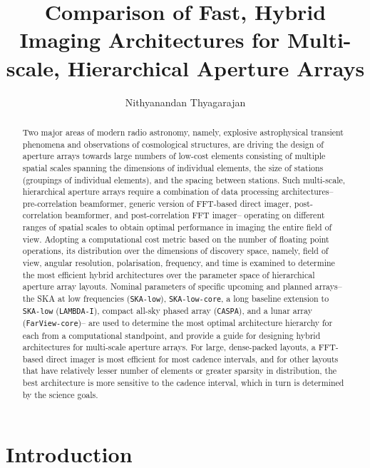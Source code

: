 \documentclass[
  journal=pasa,
  manuscript=article-type,
  year=2020,
  volume=37,
]{cup-journal}
\title{Comparison of Fast, Hybrid Imaging Architectures for Multi-scale, Hierarchical Aperture Arrays}
\author{Nithyanandan Thyagarajan}
\affiliation{CSIRO, Space \& Astronomy, P. O. Box 1130, Bentley, WA 6102, Australia}
\begin{document}
\begin{abstract}
Two major areas of modern radio astronomy, namely, explosive astrophysical transient phenomena and observations of cosmological structures, are driving the design of aperture arrays towards large numbers of low-cost elements consisting of multiple spatial scales spanning the dimensions of individual elements, the size of stations (groupings of individual elements), and the spacing between stations. Such multi-scale, hierarchical aperture arrays require a combination of data processing architectures-- pre-correlation beamformer, generic version of FFT-based direct imager, post-correlation beamformer, and post-correlation FFT imager-- operating on different ranges of spatial scales to obtain optimal performance in imaging the entire field of view. Adopting a computational cost metric based on the number of floating point operations, its distribution over the dimensions of discovery space, namely, field of view, angular resolution, polarisation, frequency, and time is examined to determine the most efficient hybrid architectures over the parameter space of hierarchical aperture array layouts. Nominal parameters of specific upcoming and planned arrays-- the SKA at low frequencies (\texttt{SKA-low}), \texttt{SKA-low-core}, a long baseline extension to \texttt{SKA-low} (\texttt{LAMBDA-I}), compact all-sky phased array (\texttt{CASPA}), and a lunar array (\texttt{FarView-core})-- are used to determine the most optimal architecture hierarchy for each from a computational standpoint, and provide a guide for designing hybrid architectures for multi-scale aperture arrays. For large, dense-packed layouts, a FFT-based direct imager is most efficient for most cadence intervals, and for other layouts that have relatively lesser number of elements or greater sparsity in distribution, the best architecture is more sensitive to the cadence interval, which in turn is determined by the science goals.
\end{abstract}

\section{Introduction}
\end{document}
